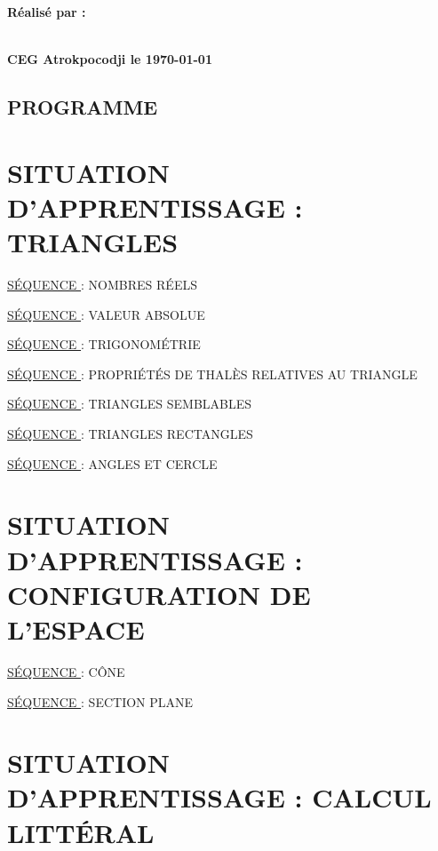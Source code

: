 \begin{titlepage}
 		\begin{center}
 			\textbf{\LARGE Réalisé par :}\\
 			\\
 		\end{center}
 		\vspace*{1cm}
 		\begin{center}
 			\Large	\textbf{CEG Atrokpocodji le    \today }
 		\end{center}
 	\end{titlepage}
 	\restoregeometry
  \begin{center}
  	\section*{PROGRAMME }
  \end{center}
  \section*{SITUATION D’APPRENTISSAGE  : TRIANGLES}
  
  \underline{SÉQUENCE } : NOMBRES RÉELS
  
  \underline{SÉQUENCE } : VALEUR ABSOLUE
  
  \underline{SÉQUENCE } : TRIGONOMÉTRIE
  
  \underline{SÉQUENCE } : PROPRIÉTÉS DE THALÈS RELATIVES AU TRIANGLE
  
  \underline{SÉQUENCE }: TRIANGLES SEMBLABLES
  
  \underline{SÉQUENCE }: TRIANGLES RECTANGLES 
  
  \underline{SÉQUENCE }: ANGLES ET CERCLE
  
  \section*{SITUATION D’APPRENTISSAGE  : CONFIGURATION DE L’ESPACE} 
  
  \underline{SÉQUENCE }: CÔNE
  
  \underline{SÉQUENCE }: SECTION PLANE
  
  \section*{SITUATION D’APPRENTISSAGE  : CALCUL LITTÉRAL }
  
